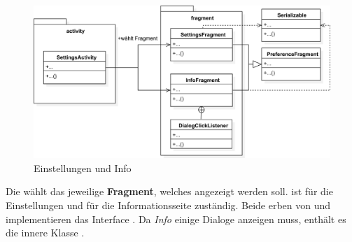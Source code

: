 \begin{figure}[h]
	\centering
	\includegraphics[width=1.0\textwidth]{resources/settingsandinfo/settingsandinfo}
	\caption{Einstellungen und Info}
\end{figure}

Die  wählt das jeweilige \textbf{Fragment}, welches
angezeigt werden soll.  ist für die Einstellungen und
 für die Informationsseite zuständig. Beide erben von
und implementieren das Interface
. Da \emph{Info} einige Dialoge anzeigen muss, enthält es
die innere Klasse .

